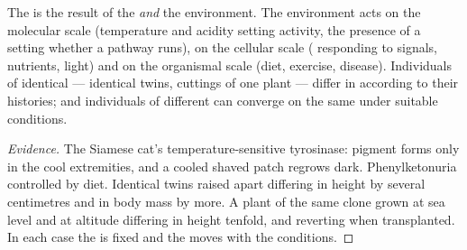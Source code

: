 \begin{proposition}\label{prop:g11:enzymes-and-phenotype:environment}
The  is the result of the  \emph{and} the
environment. The environment acts on the molecular scale (temperature
and acidity setting  activity, the presence of a 
setting whether a pathway runs), on the cellular scale (
responding to signals, nutrients, light) and on the organismal scale
(diet, exercise, disease). Individuals of identical  ---
identical twins, cuttings of one plant --- differ in 
according to their histories; and individuals of different 
can converge on the same  under suitable conditions.
\end{proposition}
\begin{proof}[Evidence]
The Siamese cat's temperature-sensitive tyrosinase: pigment forms
only in the cool extremities, and a cooled shaved patch regrows dark.
Phenylketonuria controlled by diet. Identical twins raised apart
differing in height by several centimetres and in body mass by more.
A plant of the same clone grown at sea level and at altitude
differing in height tenfold, and reverting when transplanted. In each
case the  is fixed and the  moves with the
conditions.
\end{proof}

